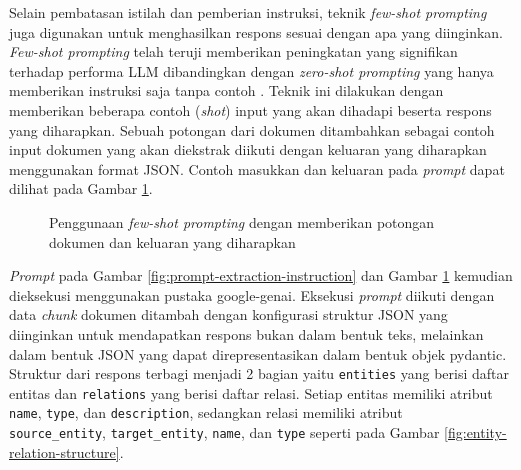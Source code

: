 Selain pembatasan istilah dan pemberian instruksi, teknik \textit{few-shot prompting} juga digunakan untuk menghasilkan respons sesuai dengan apa yang diinginkan.
\textit{Few-shot prompting} telah teruji memberikan peningkatan yang signifikan terhadap performa LLM dibandingkan dengan \textit{zero-shot prompting} yang hanya memberikan instruksi saja tanpa contoh \cite{LLMisFewShot2020}.
Teknik ini dilakukan dengan memberikan beberapa contoh (\textit{shot}) input yang akan dihadapi beserta respons yang diharapkan.
Sebuah potongan dari dokumen ditambahkan sebagai contoh input dokumen yang akan diekstrak diikuti dengan keluaran yang diharapkan menggunakan format JSON.
Contoh masukkan dan keluaran pada \textit{prompt} dapat dilihat pada Gambar \ref{fig:prompt-extraction-few-shot}.

\begin{figure}[H]
	\centering
	\caption{
		Penggunaan \textit{few-shot prompting} dengan memberikan potongan dokumen dan keluaran yang diharapkan
	}
	\label{fig:prompt-extraction-few-shot}
\end{figure}

\textit{Prompt} pada Gambar \ref{fig:prompt-extraction-instruction} dan Gambar \ref{fig:prompt-extraction-few-shot} kemudian dieksekusi menggunakan pustaka google-genai.
Eksekusi \textit{prompt} diikuti dengan data \textit{chunk} dokumen ditambah dengan konfigurasi struktur JSON yang diinginkan untuk mendapatkan respons bukan dalam bentuk teks, melainkan dalam bentuk JSON yang dapat direpresentasikan dalam bentuk objek pydantic.
Struktur dari respons terbagi menjadi 2 bagian yaitu \texttt{entities} yang berisi daftar entitas dan \texttt{relations} yang berisi daftar relasi.
Setiap entitas memiliki atribut \texttt{name}, \texttt{type}, dan \texttt{description}, sedangkan relasi memiliki atribut \\
\texttt{source\_entity}, \texttt{target\_entity}, \texttt{name}, dan \texttt{type} seperti pada Gambar \ref{fig:entity-relation-structure}.

